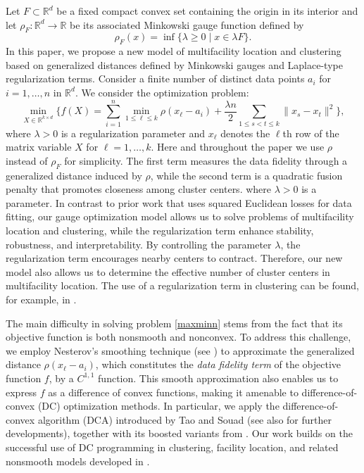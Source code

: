 \documentclass[11pt]{article}
\theoremstyle{definition}
\newcommand{\R}{\mathbb{R}}
\newcommand{\1}{\mathbf{1}}
\begin{document}
Let $F \subset \mathbb{R}^d$ be a fixed compact convex set containing the origin in its interior and let $\rho_F\colon \R^d\to \R$ be its associated Minkowski gauge function defined by 
\begin{equation}\label{gauge}
\rho_F(x) = \inf\{\lambda \ge 0 \mid x \in \lambda F\}.    
\end{equation}
In this paper,  we propose a new model of multifacility location and  clustering based on generalized distances defined by Minkowski gauges and Laplace-type regularization terms. Consider a finite number of distinct data points $a_i$ for $i=1, \ldots, n$ in $\mathbb{R}^d$. We consider the optimization problem:
\begin{equation}\label{maxminn}
	\min_{X\in\mathbb{R}^{k\times d}} \Biggl\{ f(X) = \sum_{i=1}^{n} \min_{1 \le \ell \le k} \rho(x_\ell - a_i) + \frac{\lambda n}{2} \sum_{1 \le s < t \le k} \|x_s - x_t\|^2 \Biggr\},
\end{equation}
where  $\lambda>0$ is a regularization parameter and  $x_\ell$ denotes the $\ell$th row of the matrix variable $X$ for $\ell=1,\ldots,k$. Here and throughout the paper we use $\rho$ instead of $\rho_F$ for simplicity. The first term measures
the data fidelity through a generalized distance induced by $\rho$, while the
second term is a quadratic fusion penalty that promotes closeness among cluster
centers.
where $\lambda>0$ is a parameter. In contrast to prior work that uses
squared Euclidean losses for data fitting, our gauge optimization model allows us to solve problems of multifacility location and clustering, while  the regularization term  enhance stability, robustness, and interpretability. By controlling the  parameter $\lambda$, the regularization term encourages nearby centers to contract. Therefore, our new model also  allows us to determine the  effective number of cluster centers in multifacility location. The use of a regularization term in clustering can be found, for example, in \cite{An2025, Bouveyron,Gao, Huang, Mclachlan, Martini2002}.

The main difficulty in solving problem \eqref{maxminn} stems from the fact that its objective function is both nonsmooth and nonconvex. To address this challenge, we employ Nesterov’s smoothing technique (see  \cite{nesterov2018lectures, nesterov2005smooth}) to approximate the generalized distance $\rho(x_\ell-a_i)$, which constitutes the \emph{data fidelity term} of the objective function $f$, by a $C^{1,1}$ function. This smooth approximation also enables us to express $f$ as a difference of convex functions, making it amenable to difference-of-convex (DC) optimization methods. In particular, we apply the difference-of-convex algorithm (DCA) introduced by Tao and Souad \cite{Tao1986} (see also \cite{An2005, LeThi2018, LeThi2024, TA1, TA2} for further developments), together with its boosted variants from \cite{AragonArtacho2022, AragonArtacho2018}. Our work builds on the successful use of DC programming in clustering, facility location, and related nonsmooth models developed in \cite{An2025, An2007, AragonArtacho2022, AragonArtacho2018, Artacho2020, Nam2018, Nam2017}.
\end{document}

